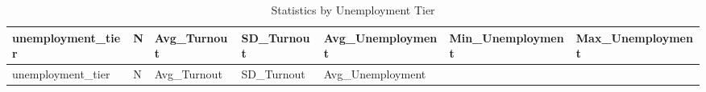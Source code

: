 \documentclass[
  11pt,
]{article}
\begin{document}
\begin{longtable}[]{@{}
  >{\raggedright\arraybackslash}p{}
  >{\raggedleft\arraybackslash}p{}
  >{\raggedleft\arraybackslash}p{}
  >{\raggedleft\arraybackslash}p{}
  >{\raggedleft\arraybackslash}p{}
  >{\raggedleft\arraybackslash}p{}
  >{\raggedleft\arraybackslash}p{}@{}}
\caption{Statistics by Unemployment Tier}\tabularnewline
\toprule\noalign{}
\begin{minipage}[b]{\linewidth}\raggedright
unemployment\_tier
\end{minipage} & \begin{minipage}[b]{\linewidth}\raggedleft
N
\end{minipage} & \begin{minipage}[b]{\linewidth}\raggedleft
Avg\_Turnout
\end{minipage} & \begin{minipage}[b]{\linewidth}\raggedleft
SD\_Turnout
\end{minipage} & \begin{minipage}[b]{\linewidth}\raggedleft
Avg\_Unemployment
\end{minipage} & \begin{minipage}[b]{\linewidth}\raggedleft
Min\_Unemployment
\end{minipage} & \begin{minipage}[b]{\linewidth}\raggedleft
Max\_Unemployment
\end{minipage} \\
\midrule\noalign{}
\endfirsthead
\toprule\noalign{}
\begin{minipage}[b]{\linewidth}\raggedright
unemployment\_tier
\end{minipage} & \begin{minipage}[b]{\linewidth}\raggedleft
N
\end{minipage} & \begin{minipage}[b]{\linewidth}\raggedleft
Avg\_Turnout
\end{minipage} & \begin{minipage}[b]{\linewidth}\raggedleft
SD\_Turnout
\end{minipage} & \begin{minipage}[b]{\linewidth}\raggedleft
Avg\_Unemployment
\end{minipage} & \begin{minipage}[b]{\linewidth}\raggedleft

\end{minipage}
\end{longtable}
\end{document}
